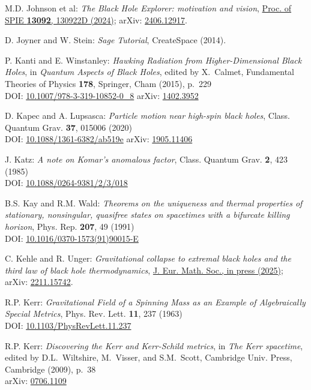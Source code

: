 \begin{thebibliography}{123}
M.D. Johnson et al:
{\em The Black Hole Explorer: motivation and vision},
\href{https://doi.org/10.1117/12.3019835}{Proc. of SPIE {\bf 13092}, 130922D (2024)};
arXiv: \href{https://arxiv.org/abs/2406.12917}{2406.12917}.

D. Joyner and W. Stein: {\em Sage Tutorial}, CreateSpace (2014).

P. Kanti and E. Winstanley: {\em Hawking Radiation from Higher-Dimensional Black Holes},
in {\em Quantum Aspects of Black Holes}, edited by X.~Calmet,
Fundamental Theories of Physics {\bf 178},
Springer, Cham (2015), p.~229\\
DOI: \href{https://doi.org/10.1007/978-3-319-10852-0_8}{10.1007/978-3-319-10852-0\_8}\hfill
arXiv: \href{https://arxiv.org/abs/1402.3952}{1402.3952}

D. Kapec and A. Lupsasca:
{\em Particle motion near high-spin black holes},
Class. Quantum Grav. {\bf 37}, 015006 (2020)\\
DOI: \href{https://doi.org/10.1088/1361-6382/ab519e}{10.1088/1361-6382/ab519e}\hfill
arXiv: \href{https://arxiv.org/abs/1905.11406}{1905.11406}

J. Katz:
{\em A note on Komar's anomalous factor},
Class. Quantum Grav. {\bf 2}, 423 (1985)\\
DOI: \href{https://doi.org/10.1088/0264-9381/2/3/018}{10.1088/0264-9381/2/3/018}

B.S. Kay and R.M. Wald:
{\em Theorems on the uniqueness and thermal properties of stationary, nonsingular, quasifree states on spacetimes with a bifurcate killing horizon},
Phys. Rep. {\bf 207}, 49 (1991)\\
DOI: \href{https://doi.org/10.1016/0370-1573(91)90015-E}{10.1016/0370-1573(91)90015-E}

C. Kehle and R. Unger:
{\em Gravitational collapse to extremal black holes and the third law of black hole thermodynamics},
\href{https://doi.org/10.4171/jems/1591}{J. Eur. Math. Soc., in press (2025)};
arXiv: \href{https://arxiv.org/abs/2211.15742}{2211.15742}.

R.P. Kerr:
{\em Gravitational Field of a Spinning Mass as an Example of Algebraically Special Metrics},
Phys. Rev. Lett. {\bf 11}, 237 (1963)\\
DOI: \href{https://doi.org/10.1103/PhysRevLett.11.237}{10.1103/PhysRevLett.11.237}

R.P. Kerr: {\em Discovering the Kerr and Kerr-Schild metrics},
in {\em The Kerr spacetime}, edited by D.L.~Wiltshire, M.~Visser, and S.M.~Scott,
Cambridge Univ. Press, Cambridge (2009), p.~38\\
arXiv: \href{https://arxiv.org/abs/0706.1109}{0706.1109}


\end{thebibliography}
